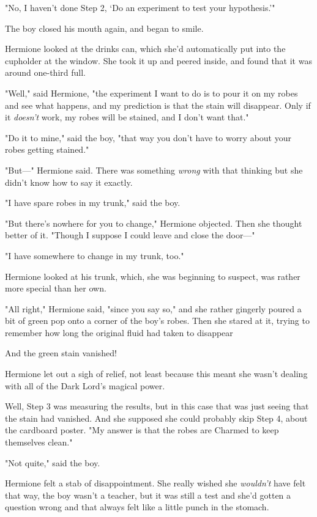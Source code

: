 "No, I haven't done Step 2, `Do an experiment to test your hypothesis.'"

The boy closed his mouth again, and began to smile.

Hermione looked at the drinks can, which she'd automatically put into the
cupholder at the window. She took it up and peered inside, and found that it
was around one-third full.

"Well," said Hermione, "the experiment I want to do is to pour it on my robes
and see what happens, and my prediction is that the stain will disappear. Only
if it \emph{doesn't} work, my robes will be stained, and I don't want that."

"Do it to mine," said the boy, "that way you don't have to worry about your
robes getting stained."

"But\mbox{---}" Hermione said. There was something \emph{wrong} with that thinking but
she didn't know how to say it exactly.

"I have spare robes in my trunk," said the boy.

"But there's nowhere for you to change," Hermione objected. Then she thought
better of it. "Though I suppose I could leave and close the door\mbox{---}"

"I have somewhere to change in my trunk, too."

Hermione looked at his trunk, which, she was beginning to suspect, was rather
more special than her own.

"All right," Hermione said, "since you say so," and she rather gingerly poured
a bit of green pop onto a corner of the boy's robes. Then she stared at it,
trying to remember how long the original fluid had taken to disappear{\el}

And the green stain vanished!

Hermione let out a sigh of relief, not least because this meant she wasn't
dealing with all of the Dark Lord's magical power.

Well, Step 3 was measuring the results, but in this case that was just seeing
that the stain had vanished. And she supposed she could probably skip Step 4,
about the cardboard poster. "My answer is that the robes are Charmed to keep
themselves clean."

"Not quite," said the boy.

Hermione felt a stab of disappointment. She really wished she \emph{wouldn't}
have felt that way, the boy wasn't a teacher, but it was still a test and she'd
gotten a question wrong and that always felt like a little punch in the stomach.

